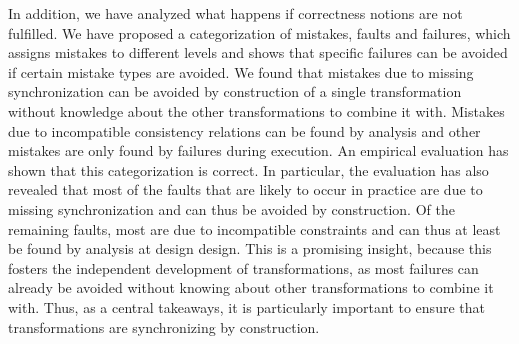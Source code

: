 In addition, we have analyzed what happens if correctness notions are not fulfilled.
We have proposed a categorization of mistakes, faults and failures, which assigns mistakes to different levels and shows that specific failures can be avoided if certain mistake types are avoided.
We found that mistakes due to missing synchronization can be avoided by construction of a single transformation without knowledge about the other transformations to combine it with.
Mistakes due to incompatible consistency relations can be found by analysis and other mistakes are only found by failures during execution.
An empirical evaluation has shown that this categorization is correct.
In particular, the evaluation has also revealed that most of the faults that are likely to occur in practice are due to missing synchronization and can thus be avoided by construction.
Of the remaining faults, most are due to incompatible constraints and can thus at least be found by analysis at design design.
This is a promising insight, because this fosters the independent development of transformations, as most failures can already be avoided without knowing about other transformations to combine it with.
Thus, as a central takeaways, it is particularly important to ensure that transformations are synchronizing by construction.

